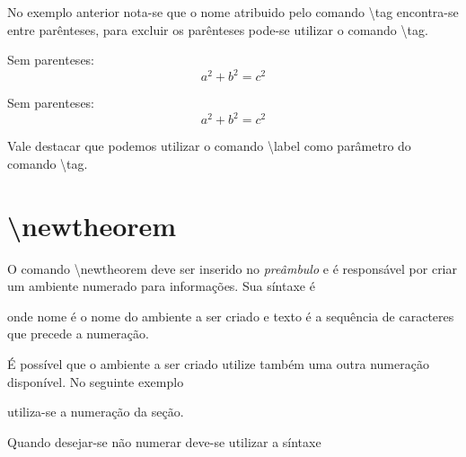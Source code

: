 No exemplo anterior nota-se que o nome atribuido pelo comando \textsf{\textbackslash tag} encontra-se entre parênteses, para excluir os parênteses pode-se utilizar o comando \textbackslash\textsf{tag}\textasteriskcentered . \\
\begin{minipage}[t]{0.47\linewidth} \vspace{-8pt}
    \begin{latexcode}
        Sem parenteses: \begin{equation}\label{E:TeoPit_ctp} 
            \tag*{Teorema de Pitagoras}
            a^2 + b^2 = c^2
        \end{equation}
    \end{latexcode}
\end{minipage}\hfill
\begin{minipage}[t]{0.47\linewidth} \vspace{0pt}
    Sem parenteses: \begin{equation}\label{E:TeoPit_ctp} 
        \tag*{Teorema de Pitagoras}
        a^2 + b^2 = c^2
    \end{equation}
\end{minipage}

Vale destacar que podemos utilizar o comando \textbackslash\textsf{label} como parâmetro do comando \textbackslash\textsf{tag}.

\section{\textbackslash\textsf{newtheorem}}
O comando \textbackslash\textsf{newtheorem} deve ser inserido no \textit{preâmbulo} e é responsável por criar um ambiente numerado para informações. Sua síntaxe é
\begin{latexcode}
    \newtheorem{nome}{texto}
\end{latexcode}
onde \textsf{nome} é o nome do ambiente a ser criado e \textsf{texto} é a sequência de caracteres que precede a numeração.

É possível que o ambiente a ser criado utilize também uma outra numeração disponível. No seguinte exemplo
\begin{latexcode}
    \newtheorem{nome}{texto}[section]
\end{latexcode}
utiliza-se a numeração da seção.

Quando desejar-se não numerar deve-se utilizar a síntaxe
\begin{latexcode}
    \newtheorem*{nome}{texto}
\end{latexcode}


